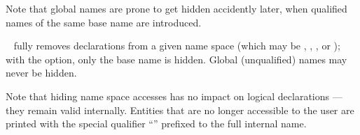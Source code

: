 \begin{isabellebody}
\begin{isamarkuptext}
\begin{description}
  Note that global names are prone to get hidden accidently later,
  when qualified names of the same base name are introduced.
  
  \item \hyperlink{command.hide}{\mbox{}}~ fully removes
  declarations from a given name space (which may be ,
  , , or ); with the  option, only the base name is hidden.  Global
  (unqualified) names may never be hidden.
  
  Note that hiding name space accesses has no impact on logical
  declarations --- they remain valid internally.  Entities that are no
  longer accessible to the user are printed with the special qualifier
  ``\isa{{\isachardoublequote}{\isacharquery}{\isacharquery}{\isachardoublequote}}'' prefixed to the full internal name.

  \end{description}%
\end{isamarkuptext}%
\isamarkuptrue%
%
\isadelimtheory
%
\endisadelimtheory
%
\isatagtheory
{}\isamarkupfalse%
%
\endisatagtheory
{\isafoldtheory}%
%
\isadelimtheory
%
\endisadelimtheory
\isanewline
\end{isabellebody}%
